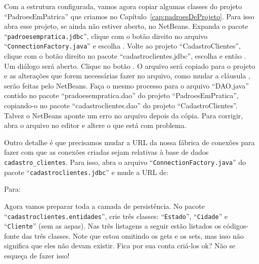 Com a estrutura configurada, vamos agora copiar algumas classes do projeto ``PadroesEmPatrica'' que criamos no Capítulo~\ref{cap:padroesDeProjeto}. Para isso abra esse projeto, se ainda não estiver aberto, no NetBeans. Expanda o pacote ``\texttt{padroesempratica.jdbc}'', clique com o botão direito no arquivo ``\texttt{ConnectionFactory.java}'' e escolha . Volte ao projeto ``CadastroClientes'', clique com o botão direito no pacote ``cadastroclientes.jdbc'', escolha  e então . Um diálogo será aberto. Clique no botão . O arquivo será copiado para o projeto e as alterações que forem necessárias fazer no arquivo, como mudar a cláusula , serão feitas pelo NetBeans. Faça o mesmo processo para o arquivo ``DAO.java'' contido no pacote ``pradoesempratica.dao'' do projeto ``PadroesEmPratica'', copiando-o no pacote ``cadastroclientes.dao'' do projeto ``CadastroClientes''. Talvez o NetBeans aponte um erro no arquivo depois da cópia. Para corrigir, abra o arquivo no editor e altere o  que está com problema. 

Outro detalhe é que precisamos mudar a URL da nossa fábrica de conexões para fazer com que as conexões criadas sejam relativas à base de dados \texttt{cadastro\_clientes}. Para isso, abra o arquivo ``\texttt{ConnectionFactory.java}'' do pacote\linebreak%
``\texttt{cadastroclientes.jdbc}'' e mude a URL de:


Para:


Agora vamos preparar toda a camada de persistência. No pacote\linebreak%
``\texttt{cadastroclientes.entidades}'', crie três classes: ``\texttt{Estado}'', ``\texttt{Cidade}'' e ``\texttt{Cliente}'' (sem as aspas). Nas três listagens a seguir estão listados os códigos-fonte das três classes. Note que estou omitindo os gets e os sets, mas isso não significa que eles não devam existir. Fica por sua conta criá-los ok? Não se esqueça de fazer isso!


